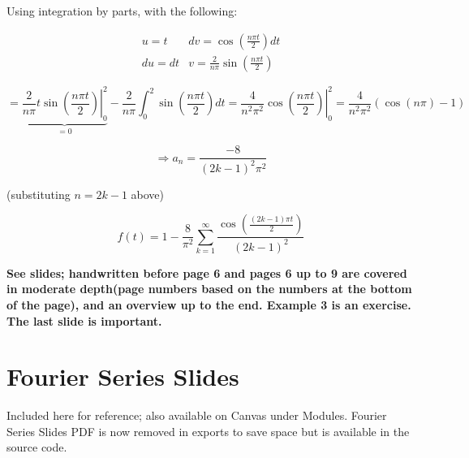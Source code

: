 \documentclass{article}
\begin{document}
Using integration by parts, with the following:

$$\begin{matrix} u = t & dv = \cos(\frac{n \pi t}{2}) dt \\ du = dt & v = \frac{2}{n \pi} \sin(\frac{n \pi t}{2}) \end{matrix}$$

$$ = \underbrace{\left. \frac{2}{n \pi} t \sin(\frac{n \pi t}{2} ) \right|_0^2}_{ = 0} - \frac{2}{n \pi} \int_{0}^2 \sin(\frac{n \pi t}{2}) dt = \left. \frac{4}{n^2 \pi^2} \cos(\frac{n \pi t}{2}) \right|_0^2 = \frac{4}{n^2 \pi^2} (\cos(n \pi) - 1)$$

$$\Rightarrow a_n = \frac{-8}{(2k-1)^2 \pi^2}$$

(substituting $n = 2k-1$ above)

$$f(t) = 1 - \frac{8}{\pi^2} \sum_{k = 1}^\infty \frac{\cos \left( \frac{(2k-1) \pi t}{2} \right)}{(2k-1)^2}$$

\textbf{See slides; handwritten before page 6 and pages 6 up to 9 are covered in moderate depth(page numbers based on the numbers at the bottom of the page), and an overview up to the end. Example 3 is an exercise. The last slide is important.}

\section{Fourier Series Slides}

Included here for reference; also available on Canvas under Modules. Fourier Series Slides PDF is now removed in exports to save space but is available in the source code. 

%
\end{document}
